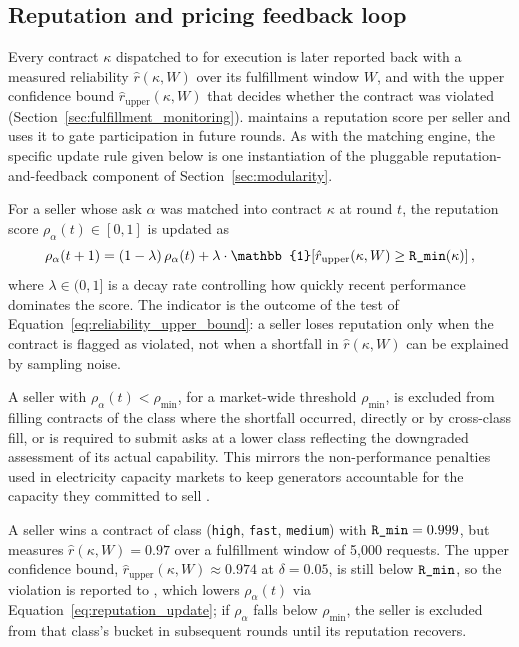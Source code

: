 \subsection{Reputation and pricing feedback loop}
\label{sec:reputation}

Every contract $\kappa$ dispatched to \NoesisServer{} for execution is later
reported back with a measured reliability $\hat r(\kappa, W)$ over its
fulfillment window $W$, and with the upper confidence bound
$\hat r_{\text{upper}}(\kappa, W)$ that decides whether the contract was
violated (Section~\ref{sec:fulfillment_monitoring}).
\NoesisMarket{} maintains a reputation score per seller and uses it to gate
participation in future rounds. As with the matching engine, the specific
update rule given below is one instantiation of the pluggable
reputation-and-feedback component of Section~\ref{sec:modularity}.

\begin{definition}
\label{def:reputation}
For a seller whose ask $\alpha$ was matched into contract $\kappa$ at
round $t$, the reputation score $\rho_\alpha(t) \in [0, 1]$ is updated as
\begin{equation}
  \label{eq:reputation_update}
  \rho_\alpha(t + 1)
    = (1 - \lambda) \, \rho_\alpha(t)
    + \lambda \cdot \mathbb{1}\!\left[
        \hat r_{\text{upper}}(\kappa, W) \geq \rminattr(\kappa)
      \right],
\end{equation}
where $\lambda \in (0, 1]$ is a decay rate controlling how quickly recent
performance dominates the score. The indicator is the outcome of the test of
Equation~\eqref{eq:reliability_upper_bound}: a seller loses reputation only
when the contract is flagged as violated, not when a shortfall in
$\hat r(\kappa, W)$ can be explained by sampling noise.
\end{definition}

A seller with $\rho_\alpha(t) < \rho_{\min}$, for a market-wide threshold
$\rho_{\min}$, is excluded from filling contracts of the class where the
shortfall occurred, directly or by cross-class fill, or is required to
submit asks at a lower class
reflecting the downgraded assessment of its actual capability. This
mirrors the non-performance penalties used in electricity capacity markets
to keep generators accountable for the capacity they committed to sell
\cite{cramtonstoft2005}.

\begin{example}[Default]
\label{ex:default}
A seller wins a contract of class
(\texttt{high}, \texttt{fast}, \texttt{medium}) with
$\textnormal{\texttt{R\_min}} = 0.999$, but \NoesisServer{} measures $\hat r(\kappa, W) =
0.97$ over a fulfillment window of 5,000 requests. The upper confidence
bound, $\hat r_{\text{upper}}(\kappa, W) \approx 0.974$ at $\delta = 0.05$,
is still below $\textnormal{\texttt{R\_min}}$, so the violation is reported to
\NoesisMarket, which lowers $\rho_\alpha(t)$ via
Equation~\eqref{eq:reputation_update}; if $\rho_\alpha$ falls below
$\rho_{\min}$, the seller is excluded from that class's bucket in
subsequent rounds until its reputation recovers.
\end{example}

